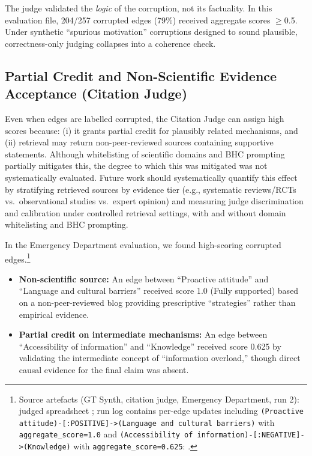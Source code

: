 The judge validated the \textit{logic} of the corruption, not its factuality. In this evaluation file, 204/257 corrupted edges (79\%) received aggregate scores $\geq$0.5. Under synthetic ``spurious motivation'' corruptions designed to sound plausible, correctness-only judging collapses into a coherence check.

\subsection{Partial Credit and Non-Scientific Evidence Acceptance (Citation Judge)}

Even when edges are labelled corrupted, the Citation Judge can assign high scores because: (i) it grants partial credit for plausibly related mechanisms, and (ii) retrieval may return non-peer-reviewed sources containing supportive statements. Although whitelisting of scientific domains and BHC prompting partially mitigates this, the degree to which this was mitigated was not systematically evaluated. Future work should systematically quantify this effect by stratifying retrieved sources by evidence tier (e.g., systematic reviews/RCTs vs.\ observational studies vs.\ expert opinion) and measuring judge discrimination and calibration under controlled retrieval settings, with and without domain whitelisting and BHC prompting.

In the Emergency Department evaluation, we found high-scoring corrupted edges.\footnote{Source artefacts (GT Synth, citation judge, Emergency Department, run 2): judged spreadsheet ; run log contains per-edge updates including \texttt{(Proactive attitude)-[:POSITIVE]->(Language and cultural barriers)} with \texttt{aggregate\_score=1.0} and \texttt{(Accessibility of information)-[:NEGATIVE]->(Knowledge)} with \texttt{aggregate\_score=0.625}: .}%
\begin{itemize}[noitemsep]
    \item \textbf{Non-scientific source:} An edge between ``Proactive attitude'' and ``Language and cultural barriers'' received score 1.0 (Fully supported) based on a non-peer-reviewed blog providing prescriptive ``strategies'' rather than empirical evidence.
    \item \textbf{Partial credit on intermediate mechanisms:} An edge between ``Accessibility of information'' and ``Knowledge'' received score 0.625 by validating the intermediate concept of ``information overload,'' though direct causal evidence for the final claim was absent.
\end{itemize}

